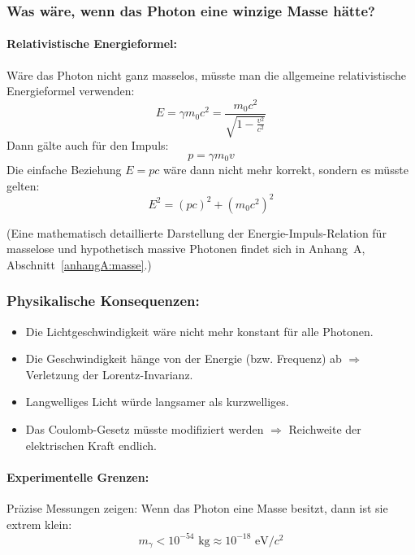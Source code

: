 \subsubsection{Was w\"are, wenn das Photon eine winzige Masse h\"atte?}

\paragraph{Relativistische Energieformel:} W\"are das Photon nicht ganz masselos, m\"usste man die allgemeine relativistische Energieformel verwenden:
\begin{equation}
	E = \gamma m_0 c^2 = \frac{m_0 c^2}{\sqrt{1 - \frac{v^2}{c^2}}}
\end{equation}
Dann g\"alte auch f\"ur den Impuls:
\begin{equation}
	p = \gamma m_0 v
\end{equation}
Die einfache Beziehung $E = pc$ w\"are dann nicht mehr korrekt, sondern es m\"usste gelten:
\begin{equation}
	E^2 = (pc)^2 + (m_0 c^2)^2
\end{equation}

(Eine mathematisch detaillierte Darstellung der Energie-Impuls-Relation für masselose und hypothetisch massive Photonen findet sich in Anhang~A, Abschnitt~\ref{anhangA:masse}.)

\subsubsection*{Physikalische Konsequenzen:}
\begin{itemize}
	\item Die Lichtgeschwindigkeit w\"are nicht mehr konstant f\"ur alle Photonen.
	\item Die Geschwindigkeit h\"ange von der Energie (bzw. Frequenz) ab $\Rightarrow$ Verletzung der Lorentz-Invarianz.
	\item Langwelliges Licht w\"urde langsamer als kurzwelliges.
	\item Das Coulomb-Gesetz m\"usste modifiziert werden $\Rightarrow$ Reichweite der elektrischen Kraft endlich.
\end{itemize}

\paragraph{Experimentelle Grenzen:}
Pr\"azise Messungen zeigen: Wenn das Photon eine Masse besitzt, dann ist sie extrem klein:
\begin{equation}
	m_\gamma < 10^{-54} \text{ kg} \approx 10^{-18} \text{ eV}/c^2
\end{equation}

